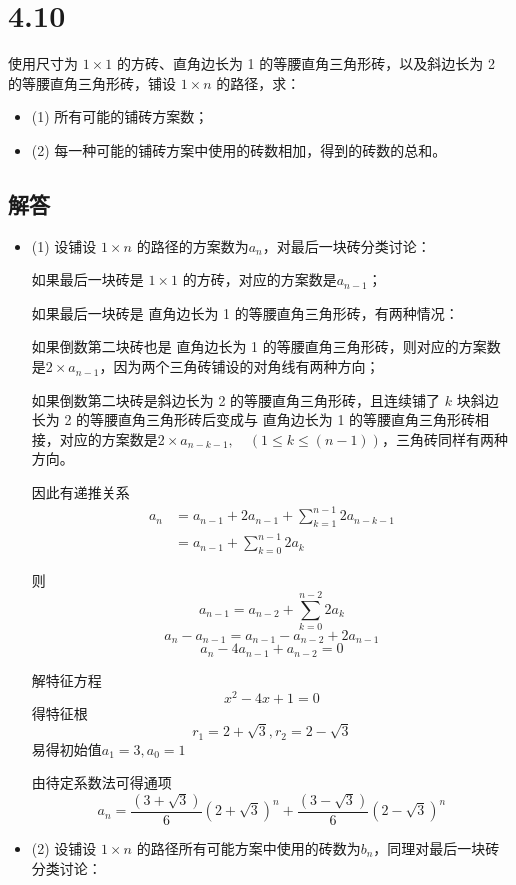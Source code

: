\documentclass[12pt]{article}
\begin{document}
\section*{4.10}
使用尺寸为 \( 1 \times 1 \) 的方砖、直角边长为 1 的等腰直角三角形砖，以及斜边长为 2 的等腰直角三角形砖，铺设 \( 1 \times n \) 的路径，求：
\begin{itemize}
    \item (1) 所有可能的铺砖方案数；
    \item (2) 每一种可能的铺砖方案中使用的砖数相加，得到的砖数的总和。
\end{itemize}
\subsection*{解答}
\begin{itemize}
    \item (1)
    设铺设 \( 1 \times n \) 的路径的方案数为$a_n$，对最后一块砖分类讨论：
    
    如果最后一块砖是 \( 1 \times 1 \) 的方砖，对应的方案数是$a_{n-1}$；

    如果最后一块砖是 直角边长为 1 的等腰直角三角形砖，有两种情况：
    
    如果倒数第二块砖也是 直角边长为 1 的等腰直角三角形砖，则对应的方案数是$2 \times a_{n-1}$，因为两个三角砖铺设的对角线有两种方向；

    如果倒数第二块砖是斜边长为 2 的等腰直角三角形砖，且连续铺了 $k$ 块斜边长为 2 的等腰直角三角形砖后变成与 直角边长为 1 的等腰直角三角形砖相接，对应的方案数是$2 \times a_{n-k-1}, \quad (1 \leq k \leq (n-1))$，三角砖同样有两种方向。

    因此有递推关系
    \begin{align}
    a_n &= a_{n-1} + 2a_{n-1} + \sum_{k=1}^{n-1} 2a_{n-k-1}\\
    &= a_{n-1} + \sum_{k=0}^{n-1} 2a_{k}
    \end{align}

    则\[a_{n-1} =  a_{n-2} + \sum_{k=0}^{n-2} 2a_{k}\]
    \[a_n-a_{n-1}=a_{n-1} -a_{n-2}+2a_{n-1}\]
    \[a_n-4a_{n-1}+a_{n-2}=0\]

    解特征方程
    \[x^2 - 4x + 1= 0\]
    得特征根
    \[r_1 = 2+\sqrt{3}, r_2 = 2-\sqrt{3}\]
    易得初始值$a_1=3, a_0=1$

    由待定系数法可得通项
    \[a_n = \frac{(3 + \sqrt{3})}{6}(2 + \sqrt{3})^n +\frac{(3 - \sqrt{3})}{6} (2 - \sqrt{3})^n\]
    
    \item (2) 设铺设 \( 1 \times n \) 的路径所有可能方案中使用的砖数为$b_n$，同理对最后一块砖分类讨论：
    

\end{itemize}
\end{document}
